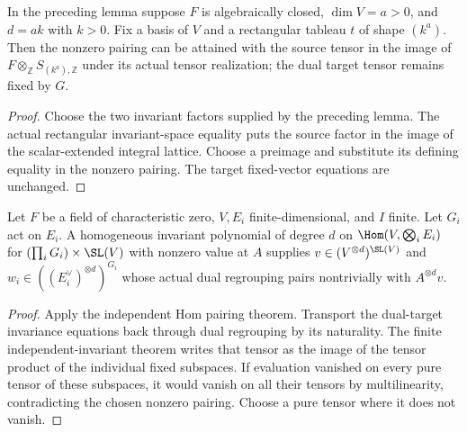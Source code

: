 \begin{lemma}
\label{lem:hom-rectangular-invariant-pairing}
\leanok
In the preceding lemma suppose $F$ is algebraically closed,
$\dim V=a>0$, and $d=ak$ with $k>0$. Fix a basis of $V$ and a
rectangular tableau $t$ of shape $(k^a)$. Then the nonzero pairing can
be attained with the source tensor in the image of
$F\otimes_{\mathbb Z}S_{(k^a),\mathbb Z}$ under its actual tensor realization;
the dual target tensor remains fixed by $G$.
\end{lemma}
\begin{proof}
Choose the two invariant factors supplied by the preceding lemma.
The actual rectangular invariant-space equality puts the source factor
in the image of the scalar-extended integral lattice. Choose a preimage
and substitute its defining equality in the nonzero pairing. The target
fixed-vector equations are unchanged.
\end{proof}

\begin{lemma}
\label{lem:dual-independent-invariant-pairing}
\leanok
Let $F$ be a field of characteristic zero, $V,E_i$ finite-dimensional,
and $I$ finite. Let $G_i$ act on $E_i$. A homogeneous invariant polynomial of degree $d$
on $\Hom(V,\bigotimes_i E_i)$ for $(\prod_i G_i)\times\SL(V)$ with
nonzero value at $A$ supplies $v\in(V^{\otimes d})^{\SL(V)}$ and
$w_i\in((E_i^\vee)^{\otimes d})^{G_i}$ whose actual dual regrouping
pairs nontrivially with $A^{\otimes d}v$.
\end{lemma}
\begin{proof}
Apply the independent Hom pairing theorem. Transport the dual-target
invariance equations back through dual regrouping by its naturality.
The finite independent-invariant theorem writes that tensor as the image
of the tensor product of the individual fixed subspaces. If evaluation
vanished on every pure tensor of these subspaces, it would vanish on
all their tensors by multilinearity, contradicting the chosen nonzero
pairing. Choose a pure tensor where it does not vanish.
\end{proof}

